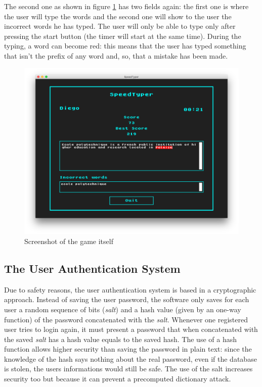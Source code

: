 \documentclass[a4paper,12pt,twoside]{article}
\begin{document}
			The second one as shown in figure \ref{fig:game} has two fields again: the first one is where the user will type the words and the second one will show to the user the incorrect words he has typed. The user will only be able to type only after pressing the start button (the timer will start at the same time). During the typing, a word can become red: this means that the user has typed something that isn't the prefix of any word and, so, that a mistake has been made. 
			
			\begin{figure}[H]
				\centering
				\includegraphics[width=0.7\columnwidth]{../screenshots/typing.png}%
				\caption{Screenshot of the game itself}%
				\label{fig:game}%
			\end{figure}
		
		\subsection{The User Authentication System}
		
			Due to safety reasons, the user authentication system is based in a cryptographic approach. Instead of saving the user password, the software only saves for each user a random sequence of bits (\emph{salt}) and a hash value (given by an one-way function) of the password concatenated with the \emph{salt}. Whenever one registered user tries to login again, it must present a password that when concatenated with the saved \emph{salt} has a hash value equals to the saved hash. The use of a hash function allows higher security than saving the password in plain text: since the knowledge of the hash says nothing about the real password, even if the database is stolen, the users informations would still be safe. The use of the salt increases security too but because it can prevent a precomputed dictionary attack.
		
\end{document}
